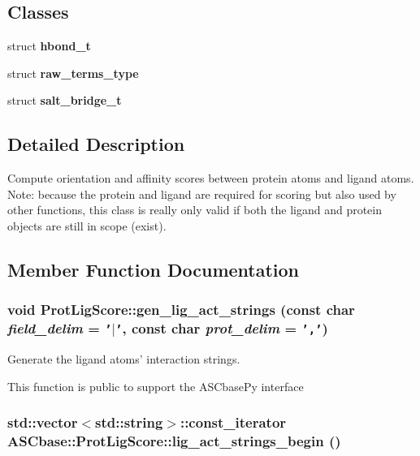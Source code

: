 \subsection*{Classes}
\begin{CompactItemize}
\item 
struct \textbf{hbond\_\-t}
\item 
struct \textbf{raw\_\-terms\_\-type}
\item 
struct \textbf{salt\_\-bridge\_\-t}
\end{CompactItemize}


\subsection{Detailed Description}
Compute orientation and affinity scores between protein atoms and ligand atoms. Note: because the protein and ligand are required for scoring but also used by other functions, this class is really only valid if both the ligand and protein objects are still in scope (exist). 



\subsection{Member Function Documentation}
\subsubsection{\setlength{\rightskip}{0pt plus 5cm}void Prot\-Lig\-Score::gen\_\-lig\_\-act\_\-strings (const char {\em field\_\-delim} = {\tt '$|$'}, const char {\em prot\_\-delim} = {\tt ','})}\label{classASCbase_1_1ProtLigScore_f89729aba4e721e341a91e795438a129}


Generate the ligand atoms' interaction strings. 

This function is public to support the ASCbase\-Py interface 
\subsubsection{\setlength{\rightskip}{0pt plus 5cm}std::vector$<$std::string$>$::const\_\-iterator ASCbase::Prot\-Lig\-Score::lig\_\-act\_\-strings\_\-begin ()\hspace{0.3cm}{\tt  [inline]}}\label{classASCbase_1_1ProtLigScore_8b4e7de39e5853938e31039394322b4f}


